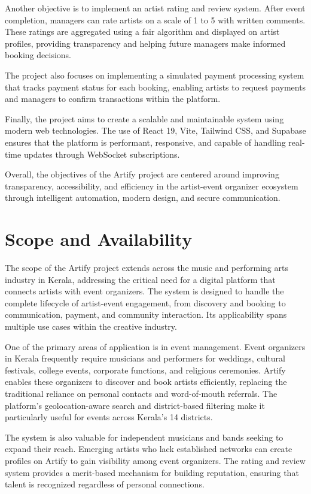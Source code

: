 \documentclass[12pt,a4paper]{report}
\begin{document}
Another objective is to implement an artist rating and review system. After event completion, managers can rate artists on a scale of 1 to 5 with written comments. These ratings are aggregated using a fair algorithm and displayed on artist profiles, providing transparency and helping future managers make informed booking decisions.

The project also focuses on implementing a simulated payment processing system that tracks payment status for each booking, enabling artists to request payments and managers to confirm transactions within the platform.

Finally, the project aims to create a scalable and maintainable system using modern web technologies. The use of React 19, Vite, Tailwind CSS, and Supabase ensures that the platform is performant, responsive, and capable of handling real-time updates through WebSocket subscriptions.

Overall, the objectives of the Artify project are centered around improving transparency, accessibility, and efficiency in the artist-event organizer ecosystem through intelligent automation, modern design, and secure communication.

\section{Scope and Availability}
The scope of the Artify project extends across the music and performing arts industry in Kerala, addressing the critical need for a digital platform that connects artists with event organizers. The system is designed to handle the complete lifecycle of artist-event engagement, from discovery and booking to communication, payment, and community interaction. Its applicability spans multiple use cases within the creative industry.

One of the primary areas of application is in event management. Event organizers in Kerala frequently require musicians and performers for weddings, cultural festivals, college events, corporate functions, and religious ceremonies. Artify enables these organizers to discover and book artists efficiently, replacing the traditional reliance on personal contacts and word-of-mouth referrals. The platform's geolocation-aware search and district-based filtering make it particularly useful for events across Kerala's 14 districts.

The system is also valuable for independent musicians and bands seeking to expand their reach. Emerging artists who lack established networks can create profiles on Artify to gain visibility among event organizers. The rating and review system provides a merit-based mechanism for building reputation, ensuring that talent is recognized regardless of personal connections.
\end{document}
